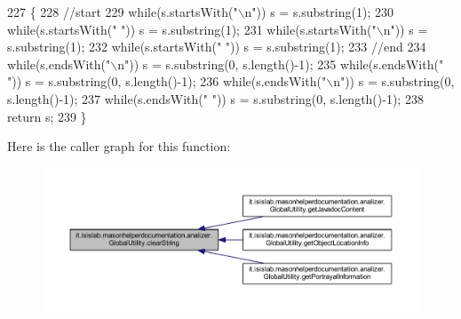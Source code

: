 \begin{DoxyCode}
227                                               \{
228         \textcolor{comment}{//start}
229         \textcolor{keywordflow}{while}(s.startsWith(\textcolor{stringliteral}{"\(\backslash\)n"}))   s = s.substring(1);
230         \textcolor{keywordflow}{while}(s.startsWith(\textcolor{stringliteral}{" "}))    s = s.substring(1);
231         \textcolor{keywordflow}{while}(s.startsWith(\textcolor{stringliteral}{"\(\backslash\)n"}))   s = s.substring(1);
232         \textcolor{keywordflow}{while}(s.startsWith(\textcolor{stringliteral}{" "}))    s = s.substring(1);
233         \textcolor{comment}{//end}
234         \textcolor{keywordflow}{while}(s.endsWith(\textcolor{stringliteral}{"\(\backslash\)n"})) s = s.substring(0, s.length()-1);
235         \textcolor{keywordflow}{while}(s.endsWith(\textcolor{stringliteral}{" "}))  s = s.substring(0, s.length()-1);
236         \textcolor{keywordflow}{while}(s.endsWith(\textcolor{stringliteral}{"\(\backslash\)n"})) s = s.substring(0, s.length()-1);
237         \textcolor{keywordflow}{while}(s.endsWith(\textcolor{stringliteral}{" "}))  s = s.substring(0, s.length()-1);
238         \textcolor{keywordflow}{return} s;
239     \}
\end{DoxyCode}


Here is the caller graph for this function\-:\nopagebreak
\begin{figure}[H]
\begin{center}
\leavevmode
\includegraphics[width=350pt]{classit_1_1isislab_1_1masonhelperdocumentation_1_1analizer_1_1_global_utility_aa713a96b1680738784bd341d3ffd1e00_icgraph}
\end{center}
\end{figure}


